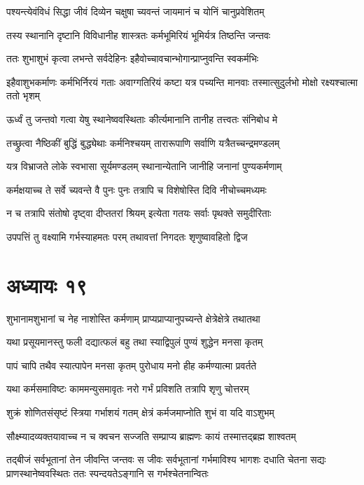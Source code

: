 \twolineshloka
{पश्यन्त्येवंविधं सिद्धा जीवं दिव्येन चक्षुषा}
{च्यवन्तं जायमानं च योनिं चानुप्रवेशितम्}


\twolineshloka
{तस्य स्थानानि दृष्टानि विविधानीह शास्त्रतः}
{कर्मभूमिरियं भूमिर्यत्र तिष्ठन्ति जन्तवः}


\twolineshloka
{ततः शुभाशुभं कृत्वा लभन्ते सर्वदेहिनः}
{इहैवोच्चावचान्भोगान्प्राप्नुवन्ति स्वकर्मभिः}


\threelineshloka
{इहैवाशुभकर्माणः कर्मभिर्निरयं गताः}
{अवाग्गतिरियं कष्टा यत्र पच्यन्ति मानवाः}
{तस्मात्सुदुर्लभो मोक्षो रक्ष्यश्चात्मा ततो भृशम्}


\twolineshloka
{ऊर्ध्वं तु जन्तवो गत्वा येषु स्थानेष्ववस्थिताः}
{कीर्त्यमानानि तानीह तत्त्वतः संनिबोध मे}


\twolineshloka
{तच्छ्रुत्वा नैष्ठिकीं बुद्धिं बुद्ध्येथाः कर्मनिश्चयम्}
{तारारूपाणि सर्वाणि यत्रैतच्चन्द्रमण्डलम्}


\twolineshloka
{यत्र विभ्राजते लोके स्वभासा सूर्यमण्डलम्}
{स्थानान्येतानि जानीहि जनानां पुण्यकर्मणाम्}


\twolineshloka
{कर्मक्षयाच्च ते सर्वे च्यवन्ते वै पुनः पुनः}
{तत्रापि च विशेषोस्ति दिवि नीचोच्चमध्यमः}


\twolineshloka
{न च तत्रापि संतोषो दृष्ट्वा दीप्ततरां श्रियम्}
{इत्येता गतयः सर्वाः पृथक्ते समुदीरिताः}


\twolineshloka
{उपपत्तिं तु वक्ष्यामि गर्भस्याहमतः परम्}
{तथावत्तां निगदतः शृणुष्वावहितो द्विज}


\chapter{अध्यायः १९}
\twolineshloka
{शुभानामशुभानां च नेह नाशोस्ति कर्मणाम्}
{प्राप्यप्राप्यानुपच्यन्ते क्षेत्रेक्षेत्रे तथातथा}


\twolineshloka
{यथा प्रसूयमानस्तु फली दद्यात्फलं बहु}
{तथा स्याद्विपुलं पुण्यं शुद्धेन मनसा कृतम्}


\twolineshloka
{पापं चापि तथैव स्यात्पापेन मनसा कृतम्}
{पुरोधाय मनो हीह कर्मण्यात्मा प्रवर्तते}


\twolineshloka
{यथा कर्मसमाविष्टः काममन्युसमावृतः}
{नरो गर्भं प्रविशति तत्रापि शृणु चोत्तरम्}


\twolineshloka
{शुक्रं शोणितसंसृष्टं स्त्रिया गर्भाशयं गतम्}
{क्षेत्रं कर्मजमाप्नोति शुभं वा यदि वाऽशुभम्}


\twolineshloka
{सौक्ष्म्यादव्यक्तयावाच्च न च क्वचन सज्जति}
{सम्प्राप्य ब्राह्मणः कायं तस्मात्तद्ब्रह्म शाश्वतम्}


तद्बीजं सर्वभूतानां तेन जीवन्ति जन्तवः
\threelineshloka
{स जीवः सर्वभूतानां गर्भमाविश्य भागशः}
{दधाति चेतना सद्यः प्राणस्थानेष्ववस्थितः}
{ततः स्पन्दयतेऽङ्गानि स गर्भश्चेतनान्वितः}


